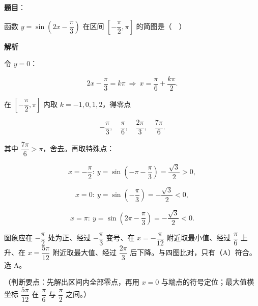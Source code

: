 \begin{answer}

\textbf{题目}：

函数 $y=\sin\left(2x-\dfrac{\pi}{3}\right)$ 在区间 $\left[-\dfrac{\pi}{2},\pi\right]$ 的简图是（　）
\nopagebreak[4]
\begin{center}\end{center}
\nopagebreak[4]
\textbf{解析}

令 $y=0$：

\nopagebreak[4]
\[2x-\frac{\pi}{3}=k\pi\ \Rightarrow\ x=\frac{\pi}{6}+\frac{k\pi}{2}.\]

在 $\left[-\dfrac{\pi}{2},\pi\right]$ 内取 $k=-1,0,1,2$，得零点

\nopagebreak[4]
\[-\frac{\pi}{3},\quad \frac{\pi}{6},\quad \frac{2\pi}{3},\quad \frac{7\pi}{6}.\]

其中 $\dfrac{7\pi}{6}>\pi$，舍去。再取特殊点：

\nopagebreak[4]
\[x=-\frac{\pi}{2}:\ y=\sin\left(-\pi-\frac{\pi}{3}\right)=\frac{\sqrt3}{2}>0,\]

\nopagebreak[4]
\[x=0:\ y=\sin\left(-\frac{\pi}{3}\right)=-\frac{\sqrt3}{2}<0,\]

\nopagebreak[4]
\[x=\pi:\ y=\sin\left(2\pi-\frac{\pi}{3}\right)=-\frac{\sqrt3}{2}<0.\]

图象应在 $-\dfrac{\pi}{2}$ 处为正、经过 $-\dfrac{\pi}{3}$ 变号、在 $x=-\dfrac{\pi}{12}$ 附近取最小值、经过 $\dfrac{\pi}{6}$ 上升、在 $x=\dfrac{5\pi}{12}$ 附近取最大值、经过 $\dfrac{2\pi}{3}$ 后下降。与四图比对，只有（A）符合。选 A。

（判断要点：先解出区间内全部零点，再用 $x=0$ 与端点的符号定位；最大值横坐标 $\dfrac{5\pi}{12}$ 在 $\dfrac{\pi}{6}$ 与 $\dfrac{\pi}{2}$ 之间。）


\end{answer}
